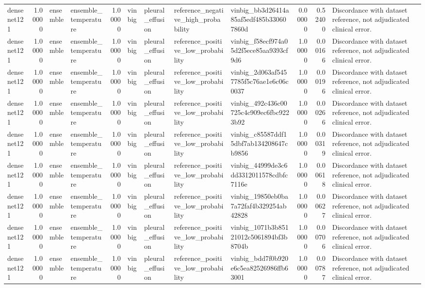 \begin{tabular}{lrllrllllrrl}
densenet121 & 1.00000 & ensemble & ensemble\_temperature & 1.00000 & vinbig & pleural\_effusion & reference\_negative\_high\_probability & vinbig\_bb3d26414a85af5edf485b330607860d & 0.00000 & 0.52400 & Discordance with dataset reference, not adjudicated clinical error. \\
densenet121 & 1.00000 & ensemble & ensemble\_temperature & 1.00000 & vinbig & pleural\_effusion & reference\_positive\_low\_probability & vinbig\_f58ecf974a05d2f5ece85aa9393cf9d6 & 1.00000 & 0.00166 & Discordance with dataset reference, not adjudicated clinical error. \\
densenet121 & 1.00000 & ensemble & ensemble\_temperature & 1.00000 & vinbig & pleural\_effusion & reference\_positive\_low\_probability & vinbig\_2d063af5457785f5c76ae1e6c06c0037 & 1.00000 & 0.00196 & Discordance with dataset reference, not adjudicated clinical error. \\
densenet121 & 1.00000 & ensemble & ensemble\_temperature & 1.00000 & vinbig & pleural\_effusion & reference\_positive\_low\_probability & vinbig\_492c436c00725c4c909ec6fbc9223b92 & 1.00000 & 0.00266 & Discordance with dataset reference, not adjudicated clinical error. \\
densenet121 & 1.00000 & ensemble & ensemble\_temperature & 1.00000 & vinbig & pleural\_effusion & reference\_positive\_low\_probability & vinbig\_c85587ddf15dbf7ab134208647cb9856 & 1.00000 & 0.00319 & Discordance with dataset reference, not adjudicated clinical error. \\
densenet121 & 1.00000 & ensemble & ensemble\_temperature & 1.00000 & vinbig & pleural\_effusion & reference\_positive\_low\_probability & vinbig\_44999de3c6dd3312011578cdbfc7116e & 1.00000 & 0.00618 & Discordance with dataset reference, not adjudicated clinical error. \\
densenet121 & 1.00000 & ensemble & ensemble\_temperature & 1.00000 & vinbig & pleural\_effusion & reference\_positive\_low\_probability & vinbig\_19850eb0ba7a72faf4b329254ab42828 & 1.00000 & 0.00627 & Discordance with dataset reference, not adjudicated clinical error. \\
densenet121 & 1.00000 & ensemble & ensemble\_temperature & 1.00000 & vinbig & pleural\_effusion & reference\_positive\_low\_probability & vinbig\_1071b3b85121012c5061894bf3b8704b & 1.00000 & 0.00706 & Discordance with dataset reference, not adjudicated clinical error. \\
densenet121 & 1.00000 & ensemble & ensemble\_temperature & 1.00000 & vinbig & pleural\_effusion & reference\_positive\_low\_probability & vinbig\_bdd7f0b920e6c5ea82526986ffb63001 & 1.00000 & 0.00787 & Discordance with dataset reference, not adjudicated clinical error. \\

\end{tabular}
